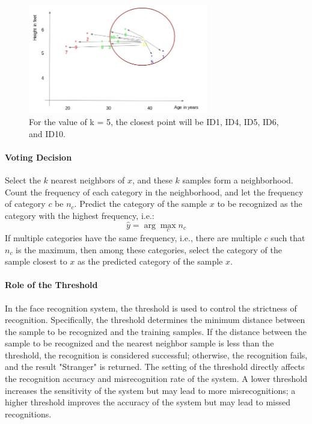 \documentclass{article}
\begin{document}
\begin{figure}[H]
    \centering
    \includegraphics[width=0.7\textwidth]{Img/Screenshot-from-2018-08-22-12-50-16.png}
    \caption{For the value of k = 5, the closest point will be ID1, ID4, ID5, ID6, and ID10.}
\end{figure}

\paragraph{Voting Decision}
Select the \( k \) nearest neighbors of \( x \), and these \( k \) samples form a neighborhood. Count the frequency of each category in the neighborhood, and let the frequency of category \( c \) be \( n_c \). Predict the category of the sample \( x \) to be recognized as the category with the highest frequency, i.e.:
\[
\hat{y} = \arg\max_{c} n_c
\]
If multiple categories have the same frequency, i.e., there are multiple \( c \) such that \( n_c \) is the maximum, then among these categories, select the category of the sample closest to \( x \) as the predicted category of the sample \( x \).

\paragraph{Role of the Threshold}
In the face recognition system, the threshold is used to control the strictness of recognition. Specifically, the threshold determines the minimum distance between the sample to be recognized and the training samples. If the distance between the sample to be recognized and the nearest neighbor sample is less than the threshold, the recognition is considered successful; otherwise, the recognition fails, and the result "Stranger" is returned. The setting of the threshold directly affects the recognition accuracy and misrecognition rate of the system. A lower threshold increases the sensitivity of the system but may lead to more misrecognitions; a higher threshold improves the accuracy of the system but may lead to missed recognitions.
\end{document}
